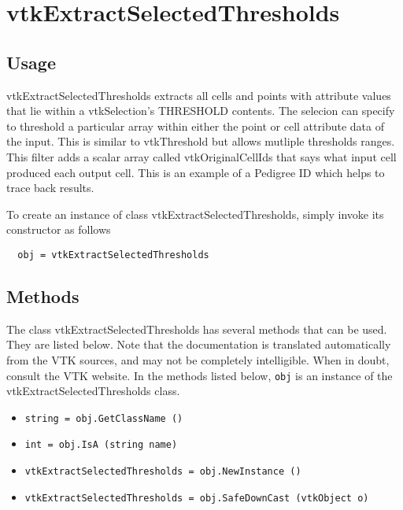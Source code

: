 \section{vtkExtractSelectedThresholds}

\subsection{Usage}

 vtkExtractSelectedThresholds extracts all cells and points with attribute 
 values that lie within a vtkSelection's THRESHOLD contents. The selecion
 can specify to threshold a particular array within either the point or cell
 attribute data of the input. This is similar to vtkThreshold
 but allows mutliple thresholds ranges.
 This filter adds a scalar array called vtkOriginalCellIds that says what 
 input cell produced each output cell. This is an example of a Pedigree ID 
 which helps to trace back results.

To create an instance of class vtkExtractSelectedThresholds, simply
invoke its constructor as follows
\begin{verbatim}
  obj = vtkExtractSelectedThresholds
\end{verbatim}
\subsection{Methods}

The class vtkExtractSelectedThresholds has several methods that can be used.
  They are listed below.
Note that the documentation is translated automatically from the VTK sources,
and may not be completely intelligible.  When in doubt, consult the VTK website.
In the methods listed below, \verb|obj| is an instance of the vtkExtractSelectedThresholds class.
\begin{itemize}
\item  \verb|string = obj.GetClassName ()|

\item  \verb|int = obj.IsA (string name)|

\item  \verb|vtkExtractSelectedThresholds = obj.NewInstance ()|

\item  \verb|vtkExtractSelectedThresholds = obj.SafeDownCast (vtkObject o)|

\end{itemize}

